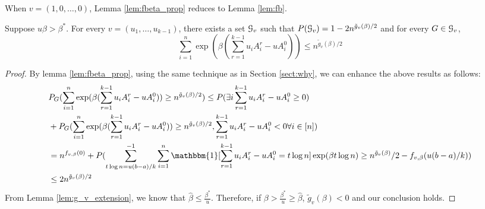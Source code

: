 \documentclass{article}
\begin{document}
\begin{remark}
	When $v=(1,0,\dots, 0)$, Lemma \ref{lem:fbeta_prop} reduces to Lemma \ref{lem:fb}.
\end{remark}
\begin{lemma}\label{lem:large}
	Suppose $u\beta > \beta^*$. For every $v=(u_1, \dots, u_{k-1})$,
	there exists a set $\mathcal{G}_v$ such that $P(\mathcal{G}_v) = 1-2n^{\tilde{g}_v(\beta)/2}$ and for every $G\in \mathcal{G}_v$,
	\begin{equation}
	\sum_{i=1}^n \exp(\beta(\sum_{r=1}^{k-1}u_i A_i^r - u A_i^0)) \leq n^{\tilde{g}_v(\beta)/2}
	\end{equation}
\end{lemma}
\begin{proof}

	By lemma \ref{lem:fbeta_prop},
	using the same technique as in Section \ref{sect:why}, we can enhance the above results as follows:
	\begin{align*}
		&P_G(\sum_{i=1}^n \exp(\beta(\sum_{r=1}^{k-1}u_i A_i^r - u A_i^0)) \geq n^{\tilde{g}_v(\beta)/2})
		 \leq P(\exists i \sum_{r=1}^{k-1}u_i A_i^r - u A_i^0 \geq 0 ) \\
		&+ 
		P_G(\sum_{i=1}^n \exp(\beta(\sum_{r=1}^{k-1}u_i A_i^r - u A_i^0)) \geq n^{\tilde{g}_v(\beta)/2}, \sum_{r=1}^{k-1}u_i A_i^r - u A_i^0 < 0 \forall i \in [n])
		\\
		&= n^{f_{v,\beta}(0)} + P(\sum_{t\log n = u(b-a)/k}^{-1}\sum_{i=1}^n \mathbbm{1}[\sum_{r=1}^{k-1} u_iA_i^r -u A_i^0=t\log n]\exp(\beta t \log n) \geq n^{\tilde{g}_v(\beta)}/2 - f_{v,\beta}(u(b-a)/k)) \\
		&\leq 2n^{\tilde{g}_v(\beta)/2}
	\end{align*}
	From Lemma \ref{lem:g_v_extension}, we know that $\hat{\beta}\leq \frac{\beta^*}{u}$.
	Therefore, if $\beta > \frac{\beta^*}{u} \geq \hat{\beta}$, $\tilde{g}_v(\beta) < 0$ and our conclusion holds.
\end{proof}




\end{document}
